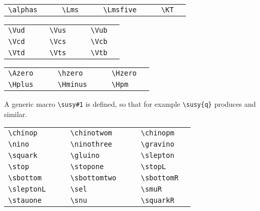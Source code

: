 \documentclass{style/atlasdoc}
\begin{document}
\medskip

\begin{tabular}{llcllcllcll}
  \verb+\alphas+ & \alphas{} & \hspace{1cm} &
  \verb+\Lms+ & \Lms{} & \hspace{1cm} &
  \verb+\Lmsfive+ & \Lmsfive{} & \hspace{1cm} &
  \verb+\KT+ & \KT{} \\
\end{tabular}

\medskip

\begin{tabular}{llcllcll}
  \verb+\Vud+ & \Vud{} & \hspace{1cm} &
  \verb+\Vus+ & \Vus{} & \hspace{1cm} &
  \verb+\Vub+ & \Vub{} \\
  \verb+\Vcd+ & \Vcd{} &  &
  \verb+\Vcs+ & \Vcs{} &  &
  \verb+\Vcb+ & \Vcb{} \\
  \verb+\Vtd+ & \Vtd{} & &
  \verb+\Vts+ & \Vts{} & & 
  \verb+\Vtb+ & \Vtb{} \\
\end{tabular}

\medskip

\begin{tabular}{llcllcll}
  \verb+\Azero+ & \Azero{} & \hspace{1cm} &
  \verb+\hzero+ & \hzero{} & \hspace{1cm} &
  \verb+\Hzero+ & \Hzero{} \\
  \verb+\Hplus+ & \Hplus{} & &
  \verb+\Hminus+ & \Hminus{} & &
  \verb+\Hpm+ & \Hpm{} \\
\end{tabular}

\medskip

\noindent A generic macro \verb+\susy#1+ is defined, so that for
example \verb+\susy{q}+ produces  and similar.

\medskip

\begin{tabular}{llcllcll}
  \verb+\chinop+ & \chinop{} & \hspace{1cm} &
  \verb+\chinotwom+ & \chinotwom{} & \hspace{1cm} &
  \verb+\chinopm+ & \chinopm{} \\
  \verb+\nino+ & \nino{} & &
  \verb+\ninothree+ & \ninothree{} & &
  \verb+\gravino+ & \gravino{} \\
  \verb+\squark+ & \squark{} & &
  \verb+\gluino+ & \gluino{} & &
  \verb+\slepton+ & \slepton{} \\
  \verb+\stop+ & \stop{} & &
  \verb+\stopone+ & \stopone{} & &
  \verb+\stopL+ & \stopL{} \\
  \verb+\sbottom+ & \sbottom{} & &
  \verb+\sbottomtwo+ & \sbottomtwo{} & &
  \verb+\sbottomR+ & \sbottomR{} \\
  \verb+\sleptonL+ & \sleptonL{} & &
  \verb+\sel+ & \sel{} & &
  \verb+\smuR+ & \smuR{} \\
  \verb+\stauone+ & \stauone{} & &
  \verb+\snu+ & \snu{} & &
  \verb+\squarkR+ & \squarkR{} \\
\end{tabular}
\end{document}
